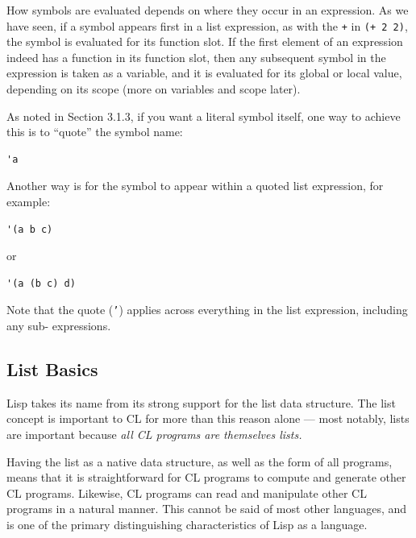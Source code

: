 \documentclass [11pt]{book}
\begin{document}
How symbols are evaluated depends on where they occur in an
expression. As we have seen, if a symbol appears first in a list
expression, as with the \texttt{+} in \texttt{(+ 2 2)}, the symbol is evaluated for its function slot. If the first 
element of an expression indeed has a function in its function slot, then any 
subsequent symbol in the expression is taken as a variable, and it is evaluated 
for its global or local value, depending on its scope (more on variables and 
scope later).



As noted in Section 3.1.3, if you want a literal symbol itself, one
way to achieve this is to ``quote'' the symbol name:

\begin{verbatim}'a
\end{verbatim}



Another way is for the symbol to appear within a quoted list expression, for example:

\begin{verbatim}'(a b c)
\end{verbatim} or 

\begin{verbatim}'(a (b c) d)
\end{verbatim}



Note that the quote (\texttt{'}) applies across everything in the list expression, including any sub- expressions.



\subsection{List Basics}

\label{subsec:listbasics}



Lisp takes its name from its strong support for the list data
structure. The list concept is important to CL for more than this
reason alone --- most notably, lists are important because \emph{all CL programs are themselves lists.}



 Having the list as a native data structure, as well as the form of all
programs, means that it is straightforward for CL programs to compute
and generate other CL programs. Likewise, CL programs can read and
manipulate other CL programs in a natural manner. This cannot be said
of most other languages, and is one of the primary distinguishing
characteristics of Lisp as a language.
\end{document}
